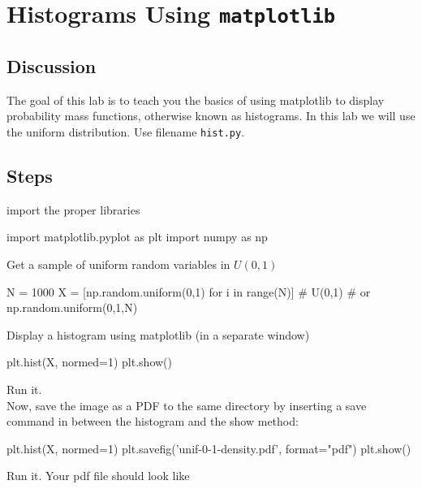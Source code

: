 \chapter{Histograms Using {\tt matplotlib}}

\setcounter{problem}{1}
\section{Discussion}

\begin{fullwidth}


The goal of this lab is to teach you the basics of using matplotlib to display probability mass functions, otherwise known as histograms. In this lab we will use the uniform distribution. Use filename {\tt hist.py}.

\section{Steps}

\step  import the proper libraries

\begin{pyverbatim}
import matplotlib.pyplot as plt
import numpy as np
\end{pyverbatim}

\step Get a sample of uniform random variables in $U(0,1)$

\begin{pyverbatim}
N = 1000
X = [np.random.uniform(0,1) for i in range(N)] # U(0,1)
# or np.random.uniform(0,1,N)
\end{pyverbatim}

\step Display a histogram using matplotlib (in a separate window)

\begin{pyverbatim}
plt.hist(X, normed=1)
plt.show()
\end{pyverbatim}

\step Run it. \\

\step Now, save the image as a PDF to the same directory by inserting a save command in between the histogram and the show method:

\begin{pyverbatim}
plt.hist(X, normed=1)
plt.savefig('unif-0-1-density.pdf', format="pdf")
plt.show()
\end{pyverbatim}

\step Run it. Your pdf file should look like


\end{fullwidth}
